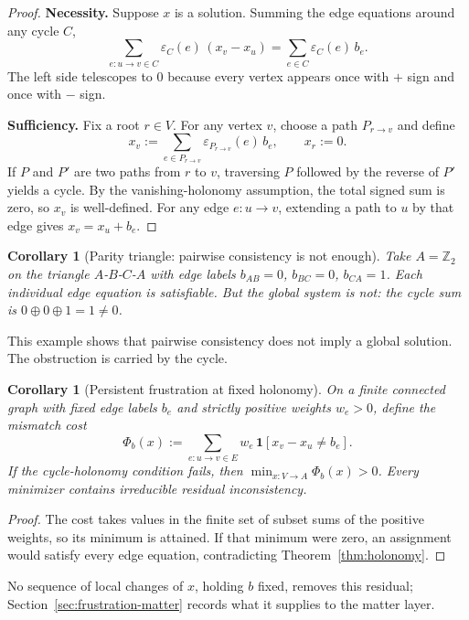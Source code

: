 \documentclass[11pt]{article}
\newtheorem{corollary}[theorem]{Corollary}
\theoremstyle{remark}
\theoremstyle{plain}
\begin{document}
\begin{proof}
\textbf{Necessity.} Suppose $x$ is a solution. Summing the edge equations around any cycle $C$,
\[
\sum_{e:u\to v\in C}\varepsilon_C(e)\,(x_v-x_u)
=
\sum_{e\in C}\varepsilon_C(e)\,b_e.
\]
The left side telescopes to $0$ because every vertex appears once with $+$ sign and once with $-$ sign.

\textbf{Sufficiency.} Fix a root $r\in V$. For any vertex $v$, choose a path $P_{r\to v}$ and define
\[
x_v := \sum_{e\in P_{r\to v}} \varepsilon_{P_{r\to v}}(e)\, b_e,
\qquad x_r:=0.
\]
If $P$ and $P'$ are two paths from $r$ to $v$, traversing $P$ followed by the reverse of $P'$ yields a cycle. By the vanishing-holonomy assumption, the total signed sum is zero, so $x_v$ is well-defined. For any edge $e:u\to v$, extending a path to $u$ by that edge gives $x_v = x_u + b_e$.
\end{proof}

\begin{corollary}[Parity triangle: pairwise consistency is not enough]\label{cor:triangle}
Take $A=\mathbb{Z}_2$ on the triangle $A$-$B$-$C$-$A$ with edge labels $b_{AB}=0$, $b_{BC}=0$, $b_{CA}=1$. Each individual edge equation is satisfiable. But the global system is not: the cycle sum is $0\oplus 0\oplus 1 = 1\neq 0$.
\end{corollary}

This example shows that pairwise consistency does not imply a global solution. The obstruction is
carried by the cycle.

\begin{corollary}[Persistent frustration at fixed holonomy]\label{cor:defects}
On a finite connected graph with fixed edge labels \(b_e\) and strictly
positive weights \(w_e>0\), define the mismatch cost
\[
\Phi_b(x) := \sum_{e:u\to v\in E} w_e\,\mathbf{1}\!\left[x_v - x_u \neq b_e\right].
\]
If the cycle-holonomy condition fails, then $\min_{x:V\to A}\Phi_b(x)>0$. Every minimizer contains irreducible residual inconsistency.
\end{corollary}

\begin{proof}
The cost takes values in the finite set of subset sums of the positive
weights, so its minimum is attained. If that minimum were zero, an
assignment would satisfy every edge equation, contradicting
Theorem~\ref{thm:holonomy}.
\end{proof}

No sequence of local changes of \(x\), holding \(b\) fixed, removes this
residual; Section~\ref{sec:frustration-matter} records what it supplies to
the matter layer.
\end{document}
